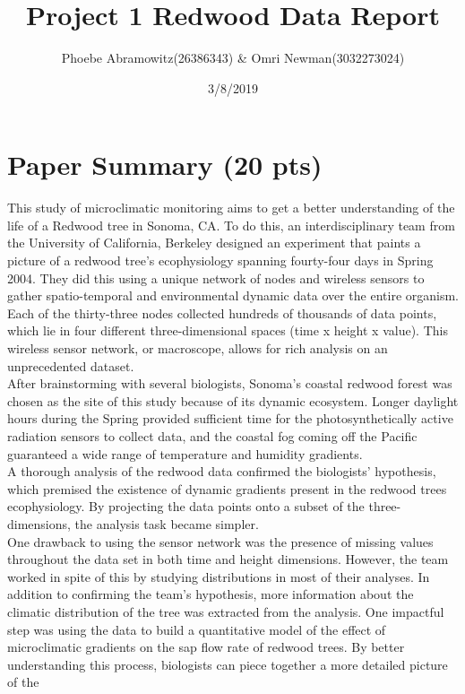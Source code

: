 \documentclass[]{article}
\title{Project 1 Redwood Data Report}
\author{Phoebe Abramowitz(26386343) \& Omri Newman(3032273024)}
\date{3/8/2019}
\begin{document}
\maketitle

\section{Paper Summary (20 pts)}\label{paper-summary-20-pts}

This study of microclimatic monitoring aims to get a better
understanding of the life of a Redwood tree in Sonoma, CA. To do this,
an interdisciplinary team from the University of California, Berkeley
designed an experiment that paints a picture of a redwood tree's
ecophysiology spanning fourty-four days in Spring 2004. They did this
using a unique network of nodes and wireless sensors to gather
spatio-temporal and environmental dynamic data over the entire organism.
Each of the thirty-three nodes collected hundreds of thousands of data
points, which lie in four different three-dimensional spaces (time x
height x value). This wireless sensor network, or macroscope, allows for
rich analysis on an unprecedented dataset.\\
After brainstorming with several biologists, Sonoma's coastal redwood
forest was chosen as the site of this study because of its dynamic
ecosystem. Longer daylight hours during the Spring provided sufficient
time for the photosynthetically active radiation sensors to collect
data, and the coastal fog coming off the Pacific guaranteed a wide range
of temperature and humidity gradients.\\
A thorough analysis of the redwood data confirmed the biologists'
hypothesis, which premised the existence of dynamic gradients present in
the redwood trees ecophysiology. By projecting the data points onto a
subset of the three-dimensions, the analysis task became simpler.\\
One drawback to using the sensor network was the presence of missing
values throughout the data set in both time and height dimensions.
However, the team worked in spite of this by studying distributions in
most of their analyses. In addition to confirming the team's hypothesis,
more information about the climatic distribution of the tree was
extracted from the analysis. One impactful step was using the data to
build a quantitative model of the effect of microclimatic gradients on
the sap flow rate of redwood trees. By better understanding this
process, biologists can piece together a more detailed picture of the
\end{document}
